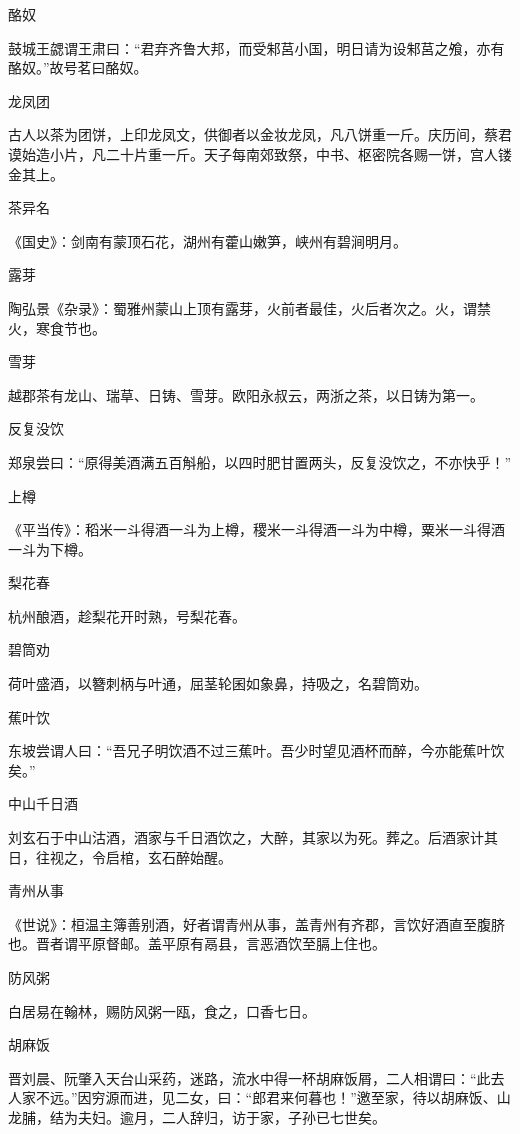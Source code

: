\documentclass[a4paper,12pt,UTF8,twoside]{ctexbook}
\begin{document}
    酪奴
    
    鼓城王勰谓王肃曰：“君弃齐鲁大邦，而受邾莒小国，明日请为设邾莒之飧，亦有酪奴。”故号茗曰酪奴。
    
    龙凤团
    
    古人以茶为团饼，上印龙凤文，供御者以金妆龙凤，凡八饼重一斤。庆历间，蔡君谟始造小片，凡二十片重一斤。天子每南郊致祭，中书、枢密院各赐一饼，宫人镂金其上。
    
    茶异名
    
    《国史》：剑南有蒙顶石花，湖州有藿山嫩笋，峡州有碧涧明月。
    
    露芽
    
    陶弘景《杂录》：蜀雅州蒙山上顶有露芽，火前者最佳，火后者次之。火，谓禁火，寒食节也。
    
    雪芽
    
    越郡茶有龙山、瑞草、日铸、雪芽。欧阳永叔云，两浙之茶，以日铸为第一。
    
    反复没饮
    
    郑泉尝曰：“原得美酒满五百斛船，以四时肥甘置两头，反复没饮之，不亦快乎！”
    
    上樽
    
    《平当传》：稻米一斗得酒一斗为上樽，稷米一斗得酒一斗为中樽，粟米一斗得酒一斗为下樽。
    
    梨花春
    
    杭州酿酒，趁梨花开时熟，号梨花春。
    
    碧筒劝
    
    荷叶盛酒，以簪刺柄与叶通，屈茎轮囷如象鼻，持吸之，名碧筒劝。
    
    蕉叶饮
    
    东坡尝谓人曰：“吾兄子明饮酒不过三蕉叶。吾少时望见酒杯而醉，今亦能蕉叶饮矣。”
    
    中山千日酒
    
    刘玄石于中山沽酒，酒家与千日酒饮之，大醉，其家以为死。葬之。后酒家计其日，往视之，令启棺，玄石醉始醒。
    
    青州从事
    
    《世说》：桓温主簿善别酒，好者谓青州从事，盖青州有齐郡，言饮好酒直至腹脐也。晋者谓平原督邮。盖平原有鬲县，言恶酒饮至膈上住也。
    
    防风粥
    
    白居易在翰林，赐防风粥一瓯，食之，口香七日。
    
    胡麻饭
    
    晋刘晨、阮肇入天台山采药，迷路，流水中得一杯胡麻饭屑，二人相谓曰：“此去人家不远。”因穷源而进，见二女，曰：“郎君来何暮也！”邀至家，待以胡麻饭、山龙脯，结为夫妇。逾月，二人辞归，访于家，子孙已七世矣。
    
\end{document}
